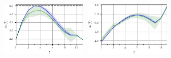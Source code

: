 \documentclass[final,3p,times,twocolumn]{elsarticle}  %
\begin{document}
\begin{figure}
	\begin{subfigure}[c]{\figwidth}
		\centering
        \includegraphics[width=0.45\textwidth]{figures/time series/case5_artificial/storage_e_4651.jpg}~
        \includegraphics[width=0.45\textwidth]{figures/time series/case5_artificial/storage_s_8601.jpg}
		

\end{subfigure}
\end{figure}
\end{document}
